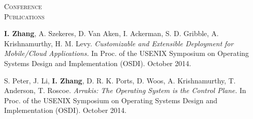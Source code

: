 \documentclass[10pt,times]{report}
\newlength{\sectiongap}
\newlength{\sectioncolwidth}
\newlength{\colgap}
\newlength{\stuffwidth}
\newenvironment{rtable}{
  \begin{minipage}{\textwidth}
  }{
  \end{minipage}
}
\newenvironment{rsection}[1]{
  \begin{minipage}[t]{\sectioncolwidth}
    \textsc{#1}
  \end{minipage}
  \hspace{\colgap}
  \begin{minipage}[t]{\stuffwidth}
  }{
    \removelastskip
  \end{minipage}
  \\[\sectiongap]
}
\begin{document}
\begin{rtable}
\begin{rsection}{Conference\\Publications}
    \textbf{I. Zhang}, A. Szekeres, D. Van Aken, I. Ackerman,
    S. D. Gribble, A. Krishnamurthy, H. M. Levy. \textit{Customizable
      and Extensible Deployment for Mobile/Cloud Applications.}  In
    Proc. of the USENIX Symposium on Operating Systems Design
    and
    Implementation (OSDI).  October 2014.\\\vspace{-0.5em}

     S. Peter, J. Li, \textbf{I. Zhang}, D. R. K. Ports, D.  Woos,
    A. Krishnamurthy, T. Anderson, T. Roscoe.  \textit{Arrakis: The
      Operating System is the Control Plane.}  In Proc. of the USENIX
    Symposium on Operating Systems Design and Implementation (OSDI).
    October 2014.  
  \end{rsection}  
\end{rtable}
\end{document}
